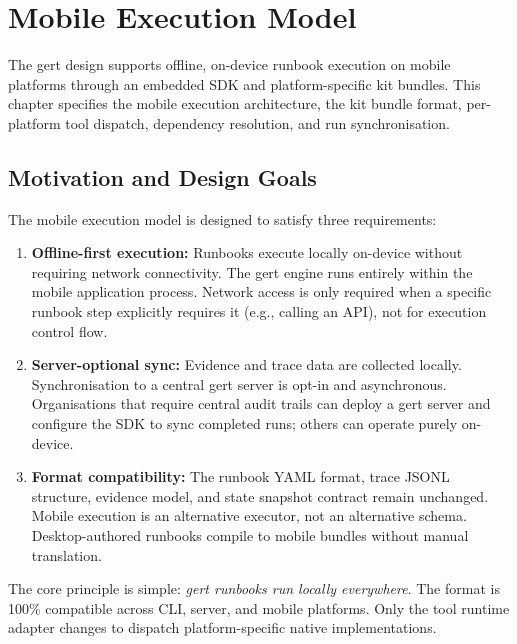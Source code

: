 \chapter{Mobile Execution Model}
\label{ch:mobile-execution}

The gert design supports offline, on-device runbook execution on mobile platforms through an embedded SDK and platform-specific kit bundles. This chapter specifies the mobile execution architecture, the kit bundle format, per-platform tool dispatch, dependency resolution, and run synchronisation.

\section{Motivation and Design Goals}

The mobile execution model is designed to satisfy three requirements:

\begin{enumerate}
  \item \textbf{Offline-first execution:} Runbooks execute locally on-device without requiring network connectivity. The gert engine runs entirely within the mobile application process. Network access is only required when a specific runbook step explicitly requires it (e.g., calling an API), not for execution control flow.
  \item \textbf{Server-optional sync:} Evidence and trace data are collected locally. Synchronisation to a central gert server is opt-in and asynchronous. Organisations that require central audit trails can deploy a gert server and configure the SDK to sync completed runs; others can operate purely on-device.
  \item \textbf{Format compatibility:} The runbook YAML format, trace JSONL structure, evidence model, and state snapshot contract remain unchanged. Mobile execution is an alternative executor, not an alternative schema. Desktop-authored runbooks compile to mobile bundles without manual translation.
\end{enumerate}

The core principle is simple: \emph{gert runbooks run locally everywhere}. The format is 100\% compatible across CLI, server, and mobile platforms. Only the tool runtime adapter changes to dispatch platform-specific native implementations.

